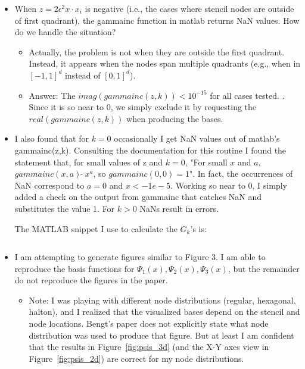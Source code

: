 \documentclass[11pt]{report}
\begin{document}
\begin{itemize}
\item When $z = 2\epsilon^2 x \cdot x_i$ is negative (i.e., the cases where stencil nodes are outside of first quadrant), the gammainc function in matlab returns NaN values. How do we handle the situation? 
\begin{itemize}
\item Actually, the problem is not when they are outside the first quadrant. Instead, it appears when the nodes span multiple quadrants (e.g., when in $[-1,1]^d$ instead of $[0,1]^d$).
\item Answer: The $imag(gammainc(z,k)) < 10^{-15}$ for all cases tested. . Since it is so near to 0, we simply exclude it by requesting the $real(gammainc(z,k))$ when producing the bases. 
\end{itemize}
\item I also found that for $k=0$ occasionally I get NaN values out of matlab's gammainc(z,k). Consulting the documentation for this routine I found the statement that, for small values of z and $k=0$, "For small $x$ and $a$, $gammainc(x,a) \  \tilde{} \ x^a$, so $gammainc(0,0) = 1$". In fact, the occurrences of NaN correspond to $a=0$ and $x < -1e-5$. Working so near to $0$, I simply added a check on the output from gammainc that catches NaN and substitutes the value 1. For $k>0$ NaNs result in errors.

The MATLAB snippet I use to calculate the $G_k$'s is: 

\begin{verbatim}

\end{verbatim}


\item I am attempting to generate figures similar to Figure 3. I am able to reproduce the basis functions for $\Psi_1(x), \Psi_2(x), \Psi_3(x)$, but the remainder do not reproduce the figures in the paper. 
\begin{itemize}
\item Note: I was playing with different node distributions (regular, hexagonal, halton), and I realized that the visualized bases depend on the stencil and node locations. Bengt's paper does not explicitly state what node distribution was used to produce that figure. But at least I am confident that the results in Figure~\ref{fig:psis_3d} (and the X-Y axes view in Figure~\ref{fig:psis_2d}) are correct for my node distributions.
\end{itemize}
\end{itemize}
\end{document}

